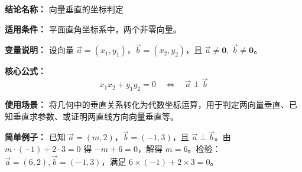 \textbf{结论名称：} 向量垂直的坐标判定

\textbf{适用条件：} 平面直角坐标系中，两个非零向量。

\textbf{变量说明：} 设向量 \(\vec{a}=(x_1,y_1)\)，\(\vec{b}=(x_2,y_2)\)，且 \(\vec{a}\neq\mathbf{0},\ \vec{b}\neq\mathbf{0}\)。

\textbf{核心公式：} 
\[
\boxed{x_1 x_2 + y_1 y_2 = 0 \quad\Longleftrightarrow\quad \vec{a} \perp \vec{b}}
\]

\textbf{使用场景：} 将几何中的垂直关系转化为代数坐标运算，用于判定两向量垂直、已知垂直求参数、或证明两直线方向向量垂直等。

\textbf{简单例子：} 已知 \(\vec{a}=(m,2)\)，\(\vec{b}=(-1,3)\)，且 \(\vec{a}\perp\vec{b}\)。由 \(m\cdot(-1)+2\cdot3=0\) 得 \(-m+6=0\)，解得 \(m=6\)。检验：\(\vec{a}=(6,2), \vec{b}=(-1,3)\)，满足 \(6\times(-1)+2\times3=0\)。